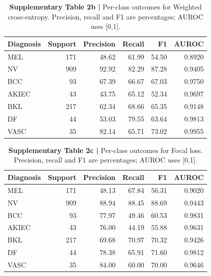 \documentclass[11pt,a4paper]{article}
\begin{document}
\begin{table}[H]\centering\sffamily\footnotesize
\caption*{\textbf{Supplementary Table 2b | }Per-class outcomes for Weighted cross-entropy. Precision, recall and F1 are percentages; AUROC uses [0,1].}
\setlength{\tabcolsep}{5pt}\renewcommand{\arraystretch}{1.18}
\begin{tabular}{lrrrrr}
\toprule
Diagnosis & Support & Precision & Recall & F1 & AUROC \\
\midrule
MEL & 171 & 48.62 & 61.99 & 54.50 & 0.8920 \\
NV & 909 & 92.92 & 82.29 & 87.28 & 0.9405 \\
BCC & 93 & 67.39 & 66.67 & 67.03 & 0.9750 \\
AKIEC & 43 & 43.75 & 65.12 & 52.34 & 0.9697 \\
BKL & 217 & 62.34 & 68.66 & 65.35 & 0.9148 \\
DF & 44 & 53.03 & 79.55 & 63.64 & 0.9813 \\
VASC & 35 & 82.14 & 65.71 & 73.02 & 0.9955 \\
\bottomrule\end{tabular}\end{table}

\begin{table}[H]\centering\sffamily\footnotesize
\caption*{\textbf{Supplementary Table 2c | }Per-class outcomes for Focal loss. Precision, recall and F1 are percentages; AUROC uses [0,1].}
\setlength{\tabcolsep}{5pt}\renewcommand{\arraystretch}{1.18}
\begin{tabular}{lrrrrr}
\toprule
Diagnosis & Support & Precision & Recall & F1 & AUROC \\
\midrule
MEL & 171 & 48.13 & 67.84 & 56.31 & 0.9020 \\
NV & 909 & 88.94 & 88.45 & 88.69 & 0.9443 \\
BCC & 93 & 77.97 & 49.46 & 60.53 & 0.9831 \\
AKIEC & 43 & 76.00 & 44.19 & 55.88 & 0.9631 \\
BKL & 217 & 69.68 & 70.97 & 70.32 & 0.9426 \\
DF & 44 & 78.38 & 65.91 & 71.60 & 0.9812 \\
VASC & 35 & 84.00 & 60.00 & 70.00 & 0.9646 \\
\bottomrule\end{tabular}\end{table}

\clearpage
\end{document}
